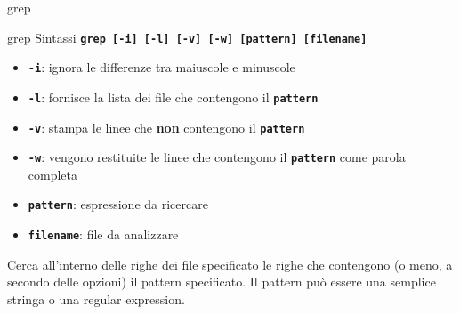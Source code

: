 \documentclass{beamer}
\begin{document}
    \begin{frame}{grep}
        \begin{block}{grep}
            Sintassi \texttt{\textbf{grep [-i] [-l] [-v] [-w] [pattern] [filename]}}

            \begin{itemize}
                \item \texttt{\textbf{-i}}: ignora le differenze tra maiuscole e minuscole
                \item \texttt{\textbf{-l}}: fornisce la lista dei file che contengono il \texttt{\textbf{pattern}}
                \item \texttt{\textbf{-v}}: stampa le linee che \textbf{non} contengono il \texttt{\textbf{pattern}}
                \item \texttt{\textbf{-w}}: vengono restituite le linee che contengono il \texttt{\textbf{pattern}} come parola completa
                \item \texttt{\textbf{pattern}}: espressione da ricercare
                \item \texttt{\textbf{filename}}: file da analizzare
            \end{itemize}

            Cerca all’interno delle righe dei file specificato le righe che
            contengono (o meno, a secondo delle opzioni) il pattern specificato. Il pattern
            può essere una semplice stringa o una regular expression.
        \end{block}
    \end{frame}
\end{document}
